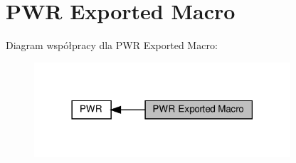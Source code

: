 \hypertarget{group___p_w_r___exported___macro}{}\section{P\+WR Exported Macro}
\label{group___p_w_r___exported___macro}
Diagram współpracy dla P\+WR Exported Macro\+:\nopagebreak
\begin{figure}[H]
\begin{center}
\leavevmode
\includegraphics[width=270pt]{group___p_w_r___exported___macro}
\end{center}
\end{figure}
